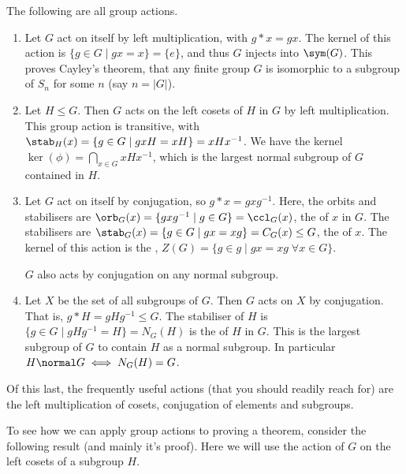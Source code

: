 \documentclass[a4paper]{scrartcl}
\begin{document}
\begin{example}
	The following are all group actions.
	\begin{enumerate}[label=(\roman*)]
		\item Let $G$ act on itself by left multiplication, with $g * x = gx$. The kernel of this action is $\{g \in G \mid gx = x \} = \{e\}$, and thus $G$ injects into $\sym(G)$. This proves Cayley's theorem, that any finite group $G$ is isomorphic to a subgroup of $S_n$ for some $n$ (say $n = |G|$).
		\item Let $H \leq G$. Then $G$ acts on the left cosets of $H$ in $G$ by left multiplication. This group action is transitive, with $\stab_H(x) = \{ g \in G \mid gxH = xH \} = xHx^{-1}$. We have the kernel $\ker(\phi) = \bigcap_{x \in G} xHx^{-1}$, which is the largest normal subgroup of $G$ contained in $H$.
		\item Let $G$ act on itself by conjugation, so $g * x = gxg^{-1}$. Here, the orbits and stabilisers are $\orb_G(x) = \{ gxg^{-1} \mid g \in G \} = \ccl_G(x)$, the  of $x$ in $G$. The stabilisers are $\stab_G(x) = \{ g \in G \mid gx = xg \} = C_G(x) \leq G$, the  of $x$. The kernel of this action is the , $Z(G) = \{ g \in g \mid gx = xg \; \forall x \in G \}$.
		
		$G$ also acts by conjugation on any normal subgroup.

		\item Let $X$ be the set of all subgroups of $G$. Then $G$ acts on $X$ by conjugation. That is, $g * H = g H g^{-1} \leq G$. The stabiliser of $H$ is $\{g \in G \mid gHg^{-1} = H \} = N_G(H)$ is the  of $H$ in $G$. This is the largest subgroup of $G$ to contain $H$ as a normal subgroup. In particular $H \normal G \iff N_G(H) = G$. 
	\end{enumerate}
\end{example}

Of this last, the frequently useful actions (that you should readily reach for) are the left multiplication of cosets, conjugation of elements and subgroups.


To see how we can apply group actions to proving a theorem, consider the following result (and mainly it's proof). Here we will use the action of $G$ on the left cosets of a subgroup $H$.
\end{document}
